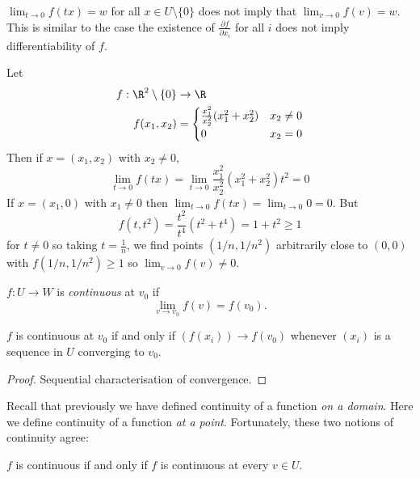 \documentclass[a4paper]{article}
\theoremstyle{definition}
\begin{document}
\begin{note}
  \(\lim_{t \to 0} f(t x) = w\) for all \( x \in U\setminus \{0\}\) does not imply that \(\lim_{v \to 0} f(v) = w\). This is similar to the case the existence of \(\frac{\partial f}{\partial x_i}\) for all \(i\) does not imply differentiability of \(f\).
\end{note}

\begin{eg}
  Let
  \begin{align*}
    f: \R^2\setminus\{0\} &\to \R \\
    f(x_1, x_2) &=
                  \begin{cases}
                    \frac{x_1^2}{x_2^2}(x_1^2 + x_2^2) & x_2 \neq 0 \\
                    0 & x_2 = 0
                  \end{cases}
  \end{align*}
  Then if \(x = (x_1, x_2)\) with \(x_2 \neq 0\),
  \[
    \lim_{t \to 0} f(t x) = \lim_{t \to 0} \frac{x_1^2}{x_2^2}(x_1^2 + x_2^2) t^2 = 0
  \]
  If \(x = (x_1, 0)\) with \(x_1 \neq 0\) then \(\lim_{t \to 0} f(t x) = \lim_{t \to 0} 0 = 0\). But
  \[
    f(t, t^2) = \frac{t^2}{t^4}(t^2 + t^4) = 1 + t^2 \geq 1
  \]
  for \(t \neq 0\) so taking \(t = \frac{1}{n}\), we find points \((1/n, 1/n^2)\) arbitrarily close to \((0, 0)\) with \(f(1/n, 1/n^2) \geq 1\) so \(\lim_{v \to 0} f(v) \neq 0\).
\end{eg}

\begin{definition}[Continuity]
  \(f: U \to W\) is \emph{continuous} at \(v_0\) if
  \[
    \lim_{v \to v_0} f(v) = f(v_0).
  \]
\end{definition}

\begin{lemma}
  \(f\) is continuous at \(v_0\) if and only if \((f(x_i)) \to f(v_0)\) whenever \((x_i)\) is a sequence in \(U\) converging to \(v_0\).
\end{lemma}

\begin{proof}
  Sequential characterisation of convergence.
\end{proof}

Recall that previously we have defined continuity of a function \emph{on a domain}. Here we define continuity of a function \emph{at a point}. Fortunately, these two notions of continuity agree:

\begin{corollary}
  \(f\) is continuous if and only if \(f\) is continuous at every \(v \in U\).
\end{corollary}
\end{document}
